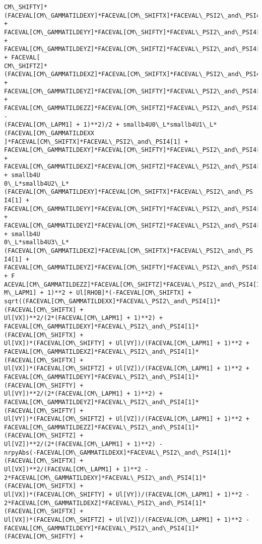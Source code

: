 \documentclass[landscape,letterpaper,10pt,english]{article}
\begin{document}
\begin{Verbatim}[commandchars=\\\{\}]
CM\_SHIFTY]*(FACEVAL[CM\_GAMMATILDEXY]*FACEVAL[CM\_SHIFTX]*FACEVAL\_PSI2\_and\_PSI4[1]
+ FACEVAL[CM\_GAMMATILDEYY]*FACEVAL[CM\_SHIFTY]*FACEVAL\_PSI2\_and\_PSI4[1] +
FACEVAL[CM\_GAMMATILDEYZ]*FACEVAL[CM\_SHIFTZ]*FACEVAL\_PSI2\_and\_PSI4[1]) + FACEVAL[
CM\_SHIFTZ]*(FACEVAL[CM\_GAMMATILDEXZ]*FACEVAL[CM\_SHIFTX]*FACEVAL\_PSI2\_and\_PSI4[1]
+ FACEVAL[CM\_GAMMATILDEYZ]*FACEVAL[CM\_SHIFTY]*FACEVAL\_PSI2\_and\_PSI4[1] +
FACEVAL[CM\_GAMMATILDEZZ]*FACEVAL[CM\_SHIFTZ]*FACEVAL\_PSI2\_and\_PSI4[1]) -
(FACEVAL[CM\_LAPM1] + 1)**2)/2 + smallb4U0\_L*smallb4U1\_L*(FACEVAL[CM\_GAMMATILDEXX
]*FACEVAL[CM\_SHIFTX]*FACEVAL\_PSI2\_and\_PSI4[1] +
FACEVAL[CM\_GAMMATILDEXY]*FACEVAL[CM\_SHIFTY]*FACEVAL\_PSI2\_and\_PSI4[1] +
FACEVAL[CM\_GAMMATILDEXZ]*FACEVAL[CM\_SHIFTZ]*FACEVAL\_PSI2\_and\_PSI4[1]) + smallb4U
0\_L*smallb4U2\_L*(FACEVAL[CM\_GAMMATILDEXY]*FACEVAL[CM\_SHIFTX]*FACEVAL\_PSI2\_and\_PS
I4[1] + FACEVAL[CM\_GAMMATILDEYY]*FACEVAL[CM\_SHIFTY]*FACEVAL\_PSI2\_and\_PSI4[1] +
FACEVAL[CM\_GAMMATILDEYZ]*FACEVAL[CM\_SHIFTZ]*FACEVAL\_PSI2\_and\_PSI4[1]) + smallb4U
0\_L*smallb4U3\_L*(FACEVAL[CM\_GAMMATILDEXZ]*FACEVAL[CM\_SHIFTX]*FACEVAL\_PSI2\_and\_PS
I4[1] + FACEVAL[CM\_GAMMATILDEYZ]*FACEVAL[CM\_SHIFTY]*FACEVAL\_PSI2\_and\_PSI4[1] + F
ACEVAL[CM\_GAMMATILDEZZ]*FACEVAL[CM\_SHIFTZ]*FACEVAL\_PSI2\_and\_PSI4[1]))/(FACEVAL[C
M\_LAPM1] + 1)**2 + Ul[RHOB]*(-FACEVAL[CM\_SHIFTX] +
sqrt((FACEVAL[CM\_GAMMATILDEXX]*FACEVAL\_PSI2\_and\_PSI4[1]*(FACEVAL[CM\_SHIFTX] +
Ul[VX])**2/(2*(FACEVAL[CM\_LAPM1] + 1)**2) +
FACEVAL[CM\_GAMMATILDEXY]*FACEVAL\_PSI2\_and\_PSI4[1]*(FACEVAL[CM\_SHIFTX] +
Ul[VX])*(FACEVAL[CM\_SHIFTY] + Ul[VY])/(FACEVAL[CM\_LAPM1] + 1)**2 +
FACEVAL[CM\_GAMMATILDEXZ]*FACEVAL\_PSI2\_and\_PSI4[1]*(FACEVAL[CM\_SHIFTX] +
Ul[VX])*(FACEVAL[CM\_SHIFTZ] + Ul[VZ])/(FACEVAL[CM\_LAPM1] + 1)**2 +
FACEVAL[CM\_GAMMATILDEYY]*FACEVAL\_PSI2\_and\_PSI4[1]*(FACEVAL[CM\_SHIFTY] +
Ul[VY])**2/(2*(FACEVAL[CM\_LAPM1] + 1)**2) +
FACEVAL[CM\_GAMMATILDEYZ]*FACEVAL\_PSI2\_and\_PSI4[1]*(FACEVAL[CM\_SHIFTY] +
Ul[VY])*(FACEVAL[CM\_SHIFTZ] + Ul[VZ])/(FACEVAL[CM\_LAPM1] + 1)**2 +
FACEVAL[CM\_GAMMATILDEZZ]*FACEVAL\_PSI2\_and\_PSI4[1]*(FACEVAL[CM\_SHIFTZ] +
Ul[VZ])**2/(2*(FACEVAL[CM\_LAPM1] + 1)**2) -
nrpyAbs(-FACEVAL[CM\_GAMMATILDEXX]*FACEVAL\_PSI2\_and\_PSI4[1]*(FACEVAL[CM\_SHIFTX] +
Ul[VX])**2/(FACEVAL[CM\_LAPM1] + 1)**2 -
2*FACEVAL[CM\_GAMMATILDEXY]*FACEVAL\_PSI2\_and\_PSI4[1]*(FACEVAL[CM\_SHIFTX] +
Ul[VX])*(FACEVAL[CM\_SHIFTY] + Ul[VY])/(FACEVAL[CM\_LAPM1] + 1)**2 -
2*FACEVAL[CM\_GAMMATILDEXZ]*FACEVAL\_PSI2\_and\_PSI4[1]*(FACEVAL[CM\_SHIFTX] +
Ul[VX])*(FACEVAL[CM\_SHIFTZ] + Ul[VZ])/(FACEVAL[CM\_LAPM1] + 1)**2 -
FACEVAL[CM\_GAMMATILDEYY]*FACEVAL\_PSI2\_and\_PSI4[1]*(FACEVAL[CM\_SHIFTY] +

\end{Verbatim}
\end{document}
